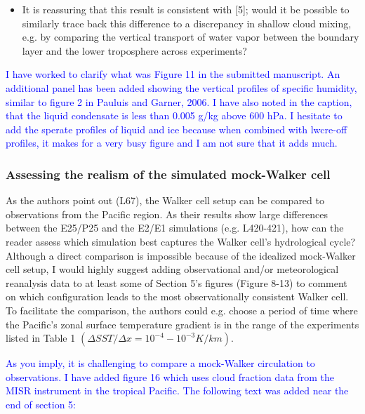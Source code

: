 \documentclass[draft]{agujournal2019}
\begin{document}
\begin{enumerate}
\begin{itemize}
      \item It is reassuring that this result is consistent with [5]; would it be possible to similarly trace back this difference to a
discrepancy in shallow cloud mixing, e.g. by comparing the vertical transport of water vapor between the boundary
layer and the lower troposphere across experiments?
    \end{itemize}
    \textcolor{blue}{I have worked to clarify what was Figure 11 in the submitted manuscript.  An additional panel has been added showing 
    the vertical profiles of specific humidity, similar to figure 2 in Pauluis and Garner, 2006.  I have also noted in the caption, that the liquid
    condensate is less than 0.005 g/kg above 600 hPa.  I hesitate to add the sperate profiles of liquid and ice because when combined with 
    lwcre-off profiles, it makes for a very busy figure and I am not sure that it adds much.  }
\end{enumerate}

\subsubsection{Assessing the realism of the simulated mock-Walker cell}

As the authors point out (L67), the Walker cell setup can be compared to observations from the Pacific region. As their
results show large differences between the E25/P25 and the E2/E1 simulations (e.g. L420-421), how can the reader
assess which simulation best captures the Walker cell’s hydrological cycle?
Although a direct comparison is impossible because of the idealized mock-Walker cell setup, I would highly suggest
adding observational and/or meteorological reanalysis data to at least some of Section 5’s figures (Figure 8-13) to comment
on which configuration leads to the most observationally consistent Walker cell. To facilitate the comparison, the authors
could e.g. choose a period of time where the Pacific’s zonal surface temperature gradient is in the range of the experiments
listed in Table 1 $(\Delta SST/ \Delta x = 10^{-4} - 10^{-3} K/km).  $

\textcolor{blue}{As you imply, it is challenging to compare a mock-Walker circulation to observations.  I have added 
figure 16 which uses cloud fraction data from the MISR instrument in the tropical Pacific.  The following text was added near the 
end of section 5: }
\end{document}

